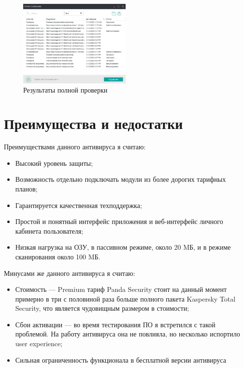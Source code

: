         \begin{figure}
            \centering
            \includegraphics[width=0.5\textwidth]{pics/fscan-results}
            \caption{Результаты полной проверки}
            \label{fres}
        \end{figure}
    \pagebreak

    \section{Преимущества и недостатки}
    Преимуществами данного антивируса я считаю:
    \begin{itemize}
        \item Высокий уровень защиты;
        \item Возможность отдельно подключать модули из более дорогих тарифных планов;
        \item Гарантируется качественная техподдержка;
        \item Простой и понятный интерфейс приложения и веб-интерфейс личного кабинета пользователя;
        \item Низкая нагрузка на ОЗУ, в пассивном режиме, около 20 MБ, и в режиме сканирования около 100 MБ.
    \end{itemize}
    Минусами же данного антивируса я считаю:
    \begin{itemize}
        \item Стоимость --- Premium тариф Panda Security стоит на данный момент примерно в три с половиной раза больше полного пакета Kaspersky Total Security,
        что является чудовищным размером в стоимости;
        \item Сбои активации --- во время тестирования ПО я встретился с такой проблемой. На работу антивируса она не повлияла, но несколько испортило user experience;
        \item Сильная ограниченность функционала в бесплатной версии антивируса
    \end{itemize}
    \pagebreak

